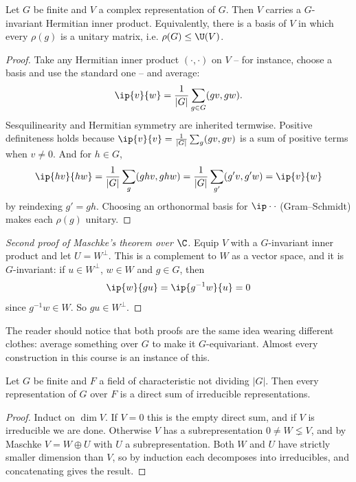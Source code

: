 \begin{lemma}
	Let $G$ be finite and $V$ a complex representation of $G$. Then $V$ carries a $G$-invariant Hermitian inner product. Equivalently, there is a basis of $V$ in which every $\rho(g)$ is a unitary matrix, i.e. $\rho(G) \leq \U(V)$.
\end{lemma}
\begin{proof}
	Take any Hermitian inner product $(\cdot,\cdot)$ on $V$ -- for instance, choose a basis and use the standard one -- and average:
	$$\ip{v}{w} = \frac{1}{|G|}\sum_{g \in G} (gv, gw).$$
	Sesquilinearity and Hermitian symmetry are inherited termwise. Positive definiteness holds because $\ip{v}{v} = \frac1{|G|}\sum_g (gv,gv)$ is a sum of positive terms when $v \neq 0$. And for $h \in G$,
	$$\ip{hv}{hw} = \frac{1}{|G|}\sum_{g}(ghv, ghw) = \frac1{|G|}\sum_{g'}(g'v,g'w) = \ip{v}{w}$$
	by reindexing $g' = gh$. Choosing an orthonormal basis for $\ip\cdot\cdot$ (Gram--Schmidt) makes each $\rho(g)$ unitary.
\end{proof}

\begin{proof}[Second proof of Maschke's theorem over $\C$]
	Equip $V$ with a $G$-invariant inner product and let $U = W^\perp$. This is a complement to $W$ as a vector space, and it is $G$-invariant: if $u \in W^\perp$, $w \in W$ and $g \in G$, then
	$$\ip{w}{gu} = \ip{g^{-1}w}{u} = 0$$
	since $g^{-1}w \in W$. So $gu \in W^\perp$.
\end{proof}

The reader should notice that both proofs are the same idea wearing different clothes: average something over $G$ to make it $G$-equivariant. Almost every construction in this course is an instance of this.

\begin{corollary}
	Let $G$ be finite and $F$ a field of characteristic not dividing $|G|$. Then every representation of $G$ over $F$ is a direct sum of irreducible representations.
\end{corollary}
\begin{proof}
	Induct on $\dim V$. If $V = 0$ this is the empty direct sum, and if $V$ is irreducible we are done. Otherwise $V$ has a subrepresentation $0 \neq W \lneq V$, and by Maschke $V = W \oplus U$ with $U$ a subrepresentation. Both $W$ and $U$ have strictly smaller dimension than $V$, so by induction each decomposes into irreducibles, and concatenating gives the result.
\end{proof}

